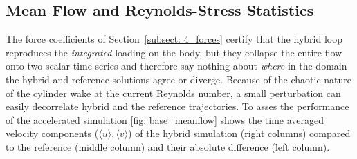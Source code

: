 \subsection{Mean Flow and Reynolds-Stress Statistics}
\label{subsect: 4_meanflow_rst}

The force coefficients of Section~\ref{subsect: 4_forces} certify that the hybrid loop reproduces the \emph{integrated} loading on the body, but they collapse the entire flow onto two scalar time series and therefore say nothing about \emph{where} in the domain the hybrid and reference solutions agree or diverge. Because of the chaotic nature of the cylinder wake at the current Reynolds number, a small perturbation can easily decorrelate hybrid and the reference trajectories. To asses the performance of the accelerated simulation \autoref{fig: base_meanflow} shows the time averaged velocity components ($\langle u\rangle, \langle v\rangle$) of the hybrid simulation (right columns) compared to the reference (middle column) and their absolute difference (left column).

